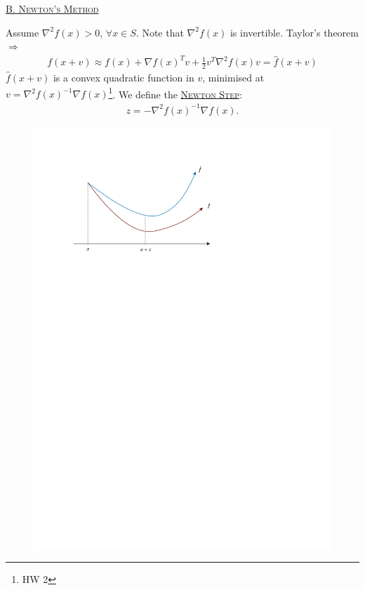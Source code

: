\noindent\underline{\textcolor{MarkerColour}{\textsc{B. Newton's Method}}}

Assume $\nabla^2 f(x) > 0$, $\forall x\in S$. Note that $\nabla^2 f(x)$ is invertible. Taylor's theorem $\Rightarrow$
\begin{align*}
    f(x+v) \approx f(x) + \nabla f(x)^T v + \frac{1}{2} v^T \nabla^2 f(x) v = \hat{f}(x+v)
\end{align*}
$\hat{f}(x+v)$ is a convex quadratic function in $v$, minimised at $v = \nabla^2 f(x)^{-1}\nabla f(x)$\footnote{HW 2}. We define the \underline{\textcolor{MarkerColour}{\textsc{Newton Step}}}:
\begin{align*}
    z = -\nabla^2 f(x)^{-1} \nabla f(x).
\end{align*}

\begin{figure}[H]
    \centering
    \includegraphics[scale = 0.8, trim={0cm, 20cm, 7cm, 3cm}, clip]{document/operation_1.drawio.pdf}
\end{figure}

